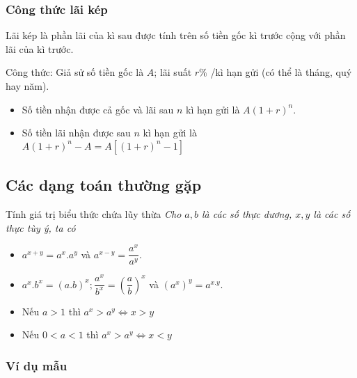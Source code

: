 \begin{tomtat}
\subsubsection{Công thức lãi kép}
\begin{dn}
	Lãi kép là phần lãi của kì sau được tính trên số tiền gốc kì trước cộng với phần lãi của kì trước.
\end{dn}
Công thức: Giả sử số tiền gốc là $A$; lãi suất $r\%$ /kì hạn gửi (có thể là tháng, quý hay năm).
\begin{itemize}
	\item Số tiền nhận được cả gốc và lãi sau $n$ kì hạn gửi là $A\left(1+r\right)^n$.
	\item Số tiền lãi nhận được sau $n$ kì hạn gửi là $A\left(1+r\right)^n-A=A\left[\left(1+r\right)^n-1\right]$
\end{itemize} 
\end{tomtat}
\subsection{Các dạng toán thường gặp}

\begin{dang}{Tính giá trị biểu thức chứa  lũy thừa}
	\textit{Cho $a, b$ là các số thực dương, $x, y$ là các số thực tùy ý, ta có}
	\begin{itemize}
		\item ${a}^{x+y}=a^x.a^y$ và ${a}^{x-y}=\dfrac{a^x}{a^y}$.
		\item $a^x.b^x=(a.b)^x; \dfrac{a^x}{b^x}={\left(\dfrac{a}{b}\right)}^x$ và $(a^x)^y={a}^{x.y}$.
		\item Nếu $a>1$ thì $a^x>a^y\Leftrightarrow x>y$
		\item Nếu $0<a<1$ thì $a^x>a^y\Leftrightarrow x<y$
	\end{itemize}
\end{dang}

\subsubsection{Ví dụ mẫu}

